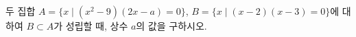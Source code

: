 두 집합 $A=\{x \mid (x^2-9)(2x-a)=0\}$, $B=\{x \mid (x-2)(x-3)=0\}$에 대하여 $B\subset A$가 성립할 때, 상수 $a$의 값을 구하시오.
